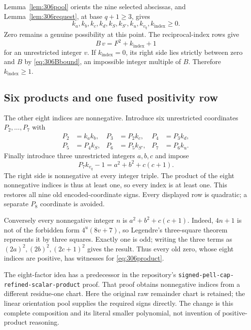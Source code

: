 Lemma~\ref{lem:306pool} orients the nine selected abscissas, and
Lemma~\ref{lem:306request}, at base $q+1\geq3$, gives
\[
 k_a,k_b,k_c,k_d,k_S,k_{S'},k_u,k_{v_q},k_{\mathrm{index}}\geq0.
\]
Zero remains a genuine possibility at this point.  The reciprocal-index
rows give
\[
 B\,v=F^2+k_{\mathrm{index}}+1
\]
for an unrestricted integer $v$.  If $k_{\mathrm{index}}=0$, its right
side lies strictly between zero and $B$ by \eqref{eq:306Bbound}, an
impossible integer multiple of $B$.  Therefore $k_{\mathrm{index}}\geq1$.

\subsection{Six products and one fused positivity row}

The other eight indices are nonnegative.  Introduce six unrestricted
coordinates $P_2,\ldots,P_7$ with
\begin{align*}
 P_2&=k_a k_b,&P_3&=P_2 k_c,&P_4&=P_3 k_d,\\
 P_5&=P_4 k_S,&P_6&=P_5 k_{S'},&P_7&=P_6 k_u.
\end{align*}
Finally introduce three unrestricted integers $a,b,c$ and impose
\begin{equation}\label{eq:306product}
 P_7 k_{v_q}-1=a^2+b^2+c(c+1).
\end{equation}
The right side is nonnegative at every integer triple.  The product of
the eight nonnegative indices is thus at least one, so every index is
at least one.  This restores all nine old encoded-coordinate signs.
Every displayed row is quadratic; a separate $P_8$ coordinate is avoided.

Conversely every nonnegative integer $n$ is
$a^2+b^2+c(c+1)$.  Indeed, $4n+1$ is not of the forbidden form
$4^u(8v+7)$, so Legendre's three-square theorem represents it by three
squares.  Exactly one is odd; writing the three terms as
$(2a)^2,(2b)^2,(2c+1)^2$ gives the result.  Thus every old zero, whose
eight indices are positive, has witnesses for \eqref{eq:306product}.

The eight-factor idea has a predecessor in the repository's
\texttt{signed-pell-cap-refined-scalar-product} proof.  That proof obtains
nonnegative indices from a different residue-one chart.  Here the original
raw remainder chart is retained; the linear orientation pool supplies the
required signs directly.  The change is this complete composition and its
literal smaller polynomial, not invention of positive-product reasoning.

